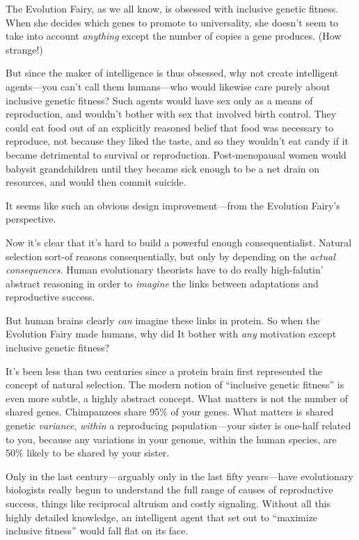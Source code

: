 {
 The Evolution Fairy, as we all know, is obsessed with inclusive
genetic fitness. When she decides which genes to promote to
universality, she doesn't seem to take into account
\textit{anything} except the number of copies a gene produces. (How
strange!)}

{
 But since the maker of intelligence is thus obsessed, why not
create intelligent agents---you can't call them
humans---who would likewise care purely about inclusive genetic
fitness? Such agents would have sex only as a means of reproduction,
and wouldn't bother with sex that involved birth
control. They could eat food out of an explicitly reasoned belief that
food was necessary to reproduce, not because they liked the taste, and
so they wouldn't eat candy if it became detrimental to
survival or reproduction. Post-menopausal women would babysit
grandchildren until they became sick enough to be a net drain on
resources, and would then commit suicide.}

{
 It seems like such an obvious design improvement---from the
Evolution Fairy's perspective.}

{
 Now it's clear that it's hard to
build a powerful enough consequentialist. Natural selection sort-of
reasons consequentially, but only by depending on the \textit{actual
consequences.} Human evolutionary theorists have to do really
high-falutin' abstract reasoning in order to
\textit{imagine} the links between adaptations and reproductive
success.}

{
 But human brains clearly \textit{can} imagine these links in
protein. So when the Evolution Fairy made humans, why did It bother
with \textit{any} motivation except inclusive genetic fitness?}

{
 It's been less than two centuries since a protein
brain first represented the concept of natural selection. The modern
notion of ``inclusive genetic
fitness'' is even more subtle, a highly abstract
concept. What matters is not the number of shared genes. Chimpanzees
share 95\% of your genes. What matters is shared genetic
\textit{variance}, \textit{within} a reproducing population---your
sister is one-half related to you, because any variations in your
genome, within the human species, are 50\% likely to be shared by your
sister.}

{
 Only in the last century---arguably only in the last fifty
years---have evolutionary biologists really begun to understand the
full range of causes of reproductive success, things like reciprocal
altruism and costly signaling. Without all this highly detailed
knowledge, an intelligent agent that set out to
``maximize inclusive fitness'' would
fall flat on its face.}

